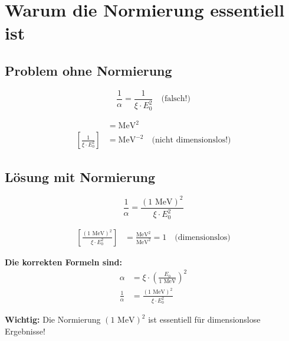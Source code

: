 	\section*{Warum die Normierung essentiell ist}
	
	\subsection*{Problem ohne Normierung}
	
	\[
	\frac{1}{\alpha} = \frac{1}{\xi \cdot E_0^2} \quad \text{(falsch!)}
	\]
	
	\begin{align*}
		[\xi \cdot E_0^2] &= \text{MeV}^2 \\
		\left[\frac{1}{\xi \cdot E_0^2}\right] &= \text{MeV}^{-2} \quad \text{(nicht dimensionslos!)}
	\end{align*}
	
	\subsection*{Lösung mit Normierung}
	
	\[
	\frac{1}{\alpha} = \frac{(1 \text{ MeV})^2}{\xi \cdot E_0^2}
	\]
	
	\begin{align*}
		\left[\frac{(1 \text{ MeV})^2}{\xi \cdot E_0^2}\right] &= \frac{\text{MeV}^2}{\text{MeV}^2} = 1 \quad \text{(dimensionslos)}
	\end{align*}
	
	\begin{tcolorbox}[colback=blue!5!white,colframe=blue!75!black]
		\textbf{Die korrekten Formeln sind:}
		\begin{align*}
			\alpha &= \xi \cdot \left(\frac{E_0}{1 \text{ MeV}}\right)^2 \\
			\frac{1}{\alpha} &= \frac{(1 \text{ MeV})^2}{\xi \cdot E_0^2}
		\end{align*}
	\end{tcolorbox}
	
	\begin{tcolorbox}[colback=red!5!white,colframe=red!75!black]
		\textbf{Wichtig:} Die Normierung $(1 \text{ MeV})^2$ ist essentiell für dimensionslose Ergebnisse!
	\end{tcolorbox}
